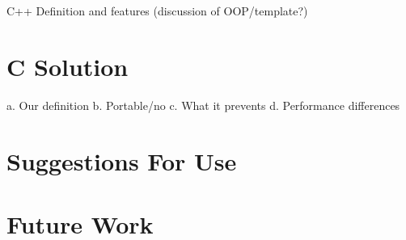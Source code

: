 \documentclass[11pt,letterpaper]{article}
\begin{document}
C++ Definition and features (discussion of OOP/template?)

\blindtext
{}

\section{C Solution}
\label{sec:cimplementation}
a.	Our definition
b.	Portable/no
c.	What it prevents
d.	Performance differences

\section{Suggestions For Use}
\label{sec:suggestions}

\section{Future Work}
\label{sec:futurework}



\printindex
\end{document}
